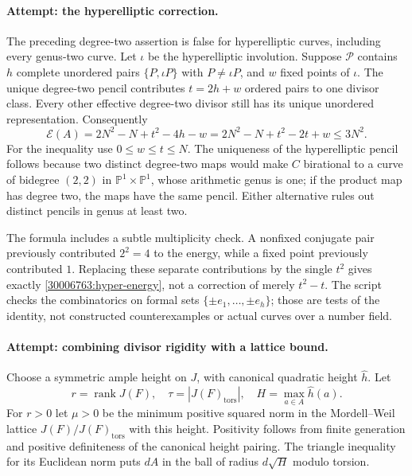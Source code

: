 \documentclass[11pt,a4paper]{article}
\newcommand{\PP}{\mathbb P}
\numberwithin{equation}{section}
\begin{document}
\paragraph{Attempt: the hyperelliptic correction.}
The preceding degree-two assertion is false for hyperelliptic curves,
including every genus-two curve. Let $\iota$ be the hyperelliptic
involution. Suppose $\mathcal P$ contains $h$ complete unordered pairs
$\{P,\iota P\}$ with $P\ne\iota P$, and $w$ fixed points of $\iota$.
The unique degree-two pencil contributes
$t=2h+w$ ordered pairs to one divisor class. Every other effective
degree-two divisor still has its unique unordered representation.
Consequently
\begin{equation}\label{30006763:hyper-energy}
 \mathcal E(A)=2N^2-N+t^2-4h-w
             =2N^2-N+t^2-2t+w\le3N^2.
\end{equation}
For the inequality use $0\le w\le t\le N$. The uniqueness of the
hyperelliptic pencil follows because two distinct degree-two maps would
make $C$ birational to a curve of bidegree $(2,2)$ in
$\PP^1\times\PP^1$, whose arithmetic genus is one; if the product map
has degree two, the maps have the same pencil. Either alternative rules
out distinct pencils in genus at least two.

The formula includes a subtle multiplicity check. A nonfixed conjugate
pair previously contributed $2^2=4$ to the energy, while a fixed point
previously contributed $1$. Replacing these separate contributions by
the single $t^2$ gives exactly \eqref{30006763:hyper-energy}, not a correction
of merely $t^2-t$. The script checks the combinatorics on formal sets
$\{\pm e_1,\ldots,\pm e_h\}$; those are tests of the identity, not
constructed counterexamples or actual curves over a number field.

\paragraph{Attempt: combining divisor rigidity with a lattice bound.}
Choose a symmetric ample height on $J$, with canonical quadratic height
$\widehat h$. Let
\[
 r=\operatorname{rank}J(F),\quad
 \tau=|J(F)_{\mathrm{tors}}|,\quad
 H=\max_{a\in A}\widehat h(a).
\]
For $r>0$ let $\mu>0$ be the minimum positive squared norm in the
Mordell--Weil lattice $J(F)/J(F)_{\mathrm{tors}}$ with this height.
Positivity follows from finite generation and positive definiteness of
the canonical height pairing. The triangle inequality for its Euclidean
norm puts $dA$ in the ball of radius $d\sqrt H$ modulo torsion.
\end{document}
